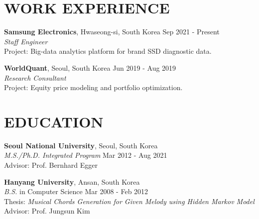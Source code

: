 \documentclass[margin]{res}
\begin{document}
\begin{resume}

\section{WORK EXPERIENCE}
\par
\textbf{Samsung Electronics}, Hwaseong-si, South Korea \hfill Sep 2021 - Present \\
\textit{Staff Engineer} \\
Project: Big-data analytics platform for brand SSD diagnostic data. \\

\vspace{-1.5em}
\par
\textbf{WorldQuant}, Seoul, South Korea \hfill Jun 2019 - Aug 2019 \\
\textit{Research Consultant} \\
Project: Equity price modeling and portfolio optimization. \\

\vspace{-1.5em}
\section{EDUCATION}
\textbf{Seoul National University}, Seoul, South Korea \\
{\sl M.S./Ph.D. Integrated Program} \hfill Mar 2012 - Aug 2021 \\
Advisor: Prof. Bernhard Egger


\vspace{-0.5em}
\textbf{Hanyang University}, Ansan, South Korea \\
{\sl B.S.} in Computer Science \hfill Mar 2008 - Feb 2012 \\
Thesis: \textit{Musical Chords Generation for Given Melody using Hidden Markov Model} \\
Advisor: Prof. Jungsun Kim


\end{resume}
\end{document}
